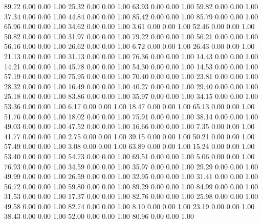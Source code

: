    89.72   0.00   0.00   1.00
   25.32   0.00   0.00   1.00
   63.93   0.00   0.00   1.00
   59.82   0.00   0.00   1.00
   37.34   0.00   0.00   1.00
   44.84   0.00   0.00   1.00
   85.42   0.00   0.00   1.00
   85.79   0.00   0.00   1.00
   65.96   0.00   0.00   1.00
   34.62   0.00   0.00   1.00
    3.61   0.00   0.00   1.00
   52.46   0.00   0.00   1.00
   50.82   0.00   0.00   1.00
   31.97   0.00   0.00   1.00
   79.22   0.00   0.00   1.00
   56.21   0.00   0.00   1.00
   56.16   0.00   0.00   1.00
   26.62   0.00   0.00   1.00
    6.72   0.00   0.00   1.00
   26.43   0.00   0.00   1.00
   21.13   0.00   0.00   1.00
   31.13   0.00   0.00   1.00
   76.36   0.00   0.00   1.00
   14.43   0.00   0.00   1.00
   14.21   0.00   0.00   1.00
   45.78   0.00   0.00   1.00
   54.30   0.00   0.00   1.00
   14.53   0.00   0.00   1.00
   57.19   0.00   0.00   1.00
   75.95   0.00   0.00   1.00
   70.40   0.00   0.00   1.00
   23.81   0.00   0.00   1.00
   28.32   0.00   0.00   1.00
   16.49   0.00   0.00   1.00
   40.27   0.00   0.00   1.00
   29.40   0.00   0.00   1.00
   25.18   0.00   0.00   1.00
   83.86   0.00   0.00   1.00
   35.97   0.00   0.00   1.00
   34.15   0.00   0.00   1.00
   53.36   0.00   0.00   1.00
    6.17   0.00   0.00   1.00
   18.47   0.00   0.00   1.00
   65.13   0.00   0.00   1.00
   51.76   0.00   0.00   1.00
   18.02   0.00   0.00   1.00
   75.91   0.00   0.00   1.00
   38.14   0.00   0.00   1.00
   49.03   0.00   0.00   1.00
   47.52   0.00   0.00   1.00
   16.66   0.00   0.00   1.00
    7.35   0.00   0.00   1.00
   41.77   0.00   0.00   1.00
    2.75   0.00   0.00   1.00
   39.15   0.00   0.00   1.00
   50.21   0.00   0.00   1.00
   57.49   0.00   0.00   1.00
    3.08   0.00   0.00   1.00
   63.89   0.00   0.00   1.00
   15.24   0.00   0.00   1.00
   53.40   0.00   0.00   1.00
   54.73   0.00   0.00   1.00
   69.51   0.00   0.00   1.00
    5.06   0.00   0.00   1.00
   76.93   0.00   0.00   1.00
   34.59   0.00   0.00   1.00
   35.97   0.00   0.00   1.00
   29.29   0.00   0.00   1.00
   49.99   0.00   0.00   1.00
   26.59   0.00   0.00   1.00
   32.95   0.00   0.00   1.00
   31.41   0.00   0.00   1.00
   56.72   0.00   0.00   1.00
   59.80   0.00   0.00   1.00
   89.29   0.00   0.00   1.00
   84.99   0.00   0.00   1.00
   31.53   0.00   0.00   1.00
   17.37   0.00   0.00   1.00
   82.76   0.00   0.00   1.00
   25.98   0.00   0.00   1.00
   49.58   0.00   0.00   1.00
   82.74   0.00   0.00   1.00
    8.10   0.00   0.00   1.00
   23.19   0.00   0.00   1.00
   38.43   0.00   0.00   1.00
   52.00   0.00   0.00   1.00
   80.96   0.00   0.00   1.00
